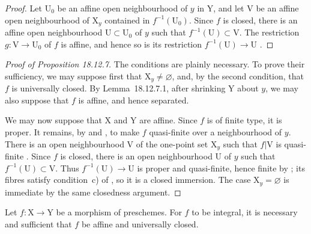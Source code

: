 \begin{proof}
Let $\mathrm{U}_0$ be an affine open neighbourhood of $y$ in $\mathrm{Y}$, and let $\mathrm{V}$ be an affine open neighbourhood of $\mathrm{X}_y$ contained in $f^{-1}(\mathrm{U}_0)$. Since $f$ is closed, there is an affine open neighbourhood $\mathrm{U}\subset\mathrm{U}_0$ of $y$ such that $f^{-1}(\mathrm{U})\subset\mathrm{V}$. The restriction $g:\mathrm{V}\to\mathrm{U}_0$ of $f$ is affine, and hence so is its restriction $f^{-1}(\mathrm{U})\to\mathrm{U}$ .
\end{proof}

\begin{proof}[Proof of Proposition 18.12.7]
The conditions are plainly necessary. To prove their sufficiency, we may suppose first that $\mathrm{X}_y\ne\varnothing$, and, by the second condition, that $f$ is universally closed. By Lemma~18.12.7.1, after shrinking $\mathrm{Y}$ about $y$, we may also suppose that $f$ is affine, and hence separated.

We may now suppose that $\mathrm{X}$ and $\mathrm{Y}$ are affine. Since $f$ is of finite type, it is proper. It remains, by  and , to make $f$ quasi-finite over a neighbourhood of $y$. There is an open neighbourhood $\mathrm{V}$ of the one-point set $\mathrm{X}_y$ such that $f|\mathrm{V}$ is quasi-finite . Since $f$ is closed, there is an open neighbourhood $\mathrm{U}$ of $y$ such that $f^{-1}(\mathrm{U})\subset\mathrm{V}$. Thus $f^{-1}(\mathrm{U})\to\mathrm{U}$ is proper and quasi-finite, hence finite by ; its fibres satisfy condition~c) of , so it is a closed immersion. The case $\mathrm{X}_y=\varnothing$ is immediate by the same closedness argument.
\end{proof}

\begin{proposition}[18.12.8]
\label{IV.18.12.8}
Let $f:\mathrm{X}\to\mathrm{Y}$ be a morphism of preschemes.
For $f$ to be integral, it is necessary and sufficient that $f$ be affine and universally closed.
\end{proposition}

